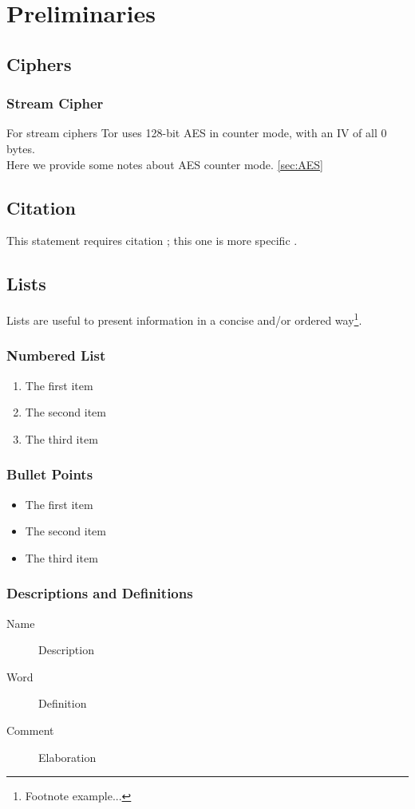 
\chapter{Preliminaries}

\section{Ciphers}
\subsection{Stream Cipher}
For stream ciphers Tor uses 128-bit AES in counter mode, with an IV of all 0 bytes.
\\
Here we provide some notes about AES counter mode.
\ref{sec:AES}



\section{Citation}

This statement requires citation \cite{article_key}; this one is more specific \cite[162]{book_key}.


\section{Lists}

Lists are useful to present information in a concise and/or ordered way\footnote{Footnote example...}.

\subsection{Numbered List}

\begin{enumerate}
\item The first item
\item The second item
\item The third item
\end{enumerate}

\subsection{Bullet Points}

\begin{itemize}
\item The first item
\item The second item
\item The third item
\end{itemize}

\subsection{Descriptions and Definitions}

\begin{description}
\item[Name] Description
\item[Word] Definition
\item[Comment] Elaboration
\end{description}

